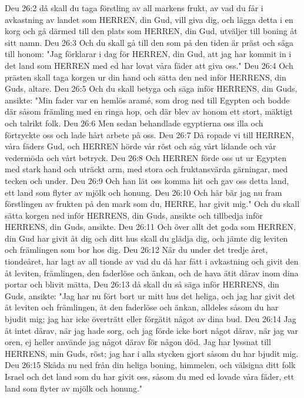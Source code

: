 Deu 26:2  då skall du taga förstling av all markens frukt, av vad du får i avkastning av landet som HERREN, din Gud, vill giva dig, och lägga detta i en korg och gå därmed till den plats som HERREN, din Gud, utväljer till boning åt sitt namn.
Deu 26:3  Och du skall gå till den som på den tiden är präst och säga till honom: "Jag förklarar i dag för HERREN, din Gud, att jag har kommit in i det land som HERREN med ed har lovat våra fäder att giva oss."
Deu 26:4  Och prästen skall taga korgen ur din hand och sätta den ned inför HERRENS, din Guds, altare.
Deu 26:5  Och du skall betyga och säga inför HERRENS, din Guds, ansikte: "Min fader var en hemlös aramé, som drog ned till Egypten och bodde där såsom främling med en ringa hop, och där blev av honom ett stort, mäktigt och talrikt folk.
Deu 26:6  Men sedan behandlade egyptierna oss illa och förtryckte oss och lade hårt arbete på oss.
Deu 26:7  Då ropade vi till HERREN, våra fäders Gud, och HERREN hörde vår röst och såg vårt lidande och vår vedermöda och vårt betryck.
Deu 26:8  Och HERREN förde oss ut ur Egypten med stark hand och uträckt arm, med stora och fruktansvärda gärningar, med tecken och under.
Deu 26:9  Och han lät oss komma hit och gav oss detta land, ett land som flyter av mjölk och honung.
Deu 26:10  Och här bär jag nu fram förstlingen av frukten på den mark som du, HERRE, har givit mig." Och du skall sätta korgen ned inför HERRENS, din Guds, ansikte och tillbedja inför HERRENS, din Guds, ansikte.
Deu 26:11  Och över allt det goda som HERREN, din Gud har givit åt dig och ditt hus skall du glädja dig, och jämte dig leviten och främlingen som bor hos dig.
Deu 26:12  När du under det tredje året, tiondeåret, har lagt av all tionde av vad du då har fått i avkastning och givit den åt leviten, främlingen, den faderlöse och änkan, och de hava ätit därav inom dina portar och blivit mätta,
Deu 26:13  då skall du så säga inför HERRENS, din Guds, ansikte: "Jag har nu fört bort ur mitt hus det heliga, och jag har givit det åt leviten och främlingen, åt den faderlöse och änkan, alldeles såsom du har bjudit mig; jag har icke överträtt eller förgätit något av dina bud.
Deu 26:14  Jag åt intet därav, när jag hade sorg, och jag förde icke bort något därav, när jag var oren, ej heller använde jag något därav för någon död. Jag har lyssnat till HERRENS, min Guds, röst; jag har i alla stycken gjort såsom du har bjudit mig.
Deu 26:15  Skåda nu ned från din heliga boning, himmelen, och välsigna ditt folk Israel och det land som du har givit oss, såsom du med ed lovade våra fäder, ett land som flyter av mjölk och honung."
